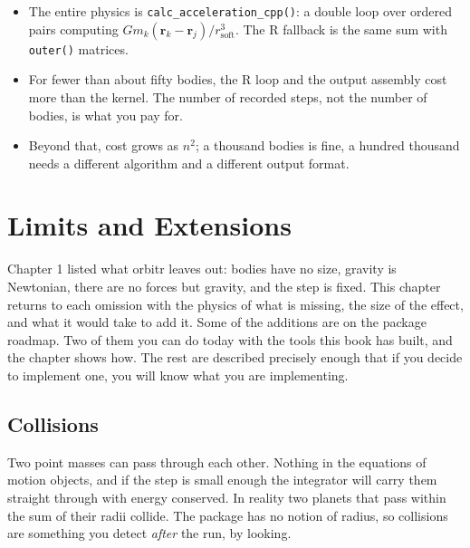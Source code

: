 \documentclass[
  10.5pt,
  letterpaper,
]{scrbook}
\providecommand{\tightlist}{%
  \setlength{\itemsep}{0pt}\setlength{\parskip}{0pt}}
\theoremstyle{plain}
\theoremstyle{remark}
\begin{document}
\begin{tcolorbox}[enhanced jigsaw, arc=.35mm, bottomrule=.15mm, bottomtitle=1mm, breakable, colback=white, colbacktitle=quarto-callout-tip-color!10!white, colframe=quarto-callout-tip-color-frame, coltitle=black, left=2mm, leftrule=.75mm, opacityback=0, opacitybacktitle=0.6, rightrule=.15mm, title={Key results}, titlerule=0mm, toprule=.15mm, toptitle=1mm]

\begin{itemize}
\tightlist
\item
  The entire physics is \texttt{calc\_acceleration\_cpp()}: a double
  loop over ordered pairs computing
  \(Gm_k(\mathbf{r}_k - \mathbf{r}_j)/r_{\mathrm{soft}}^3\). The R
  fallback is the same sum with \texttt{outer()} matrices.
\item
  For fewer than about fifty bodies, the R loop and the output assembly
  cost more than the kernel. The number of recorded steps, not the
  number of bodies, is what you pay for.
\item
  Beyond that, cost grows as \(n^2\); a thousand bodies is fine, a
  hundred thousand needs a different algorithm and a different output
  format.
\end{itemize}

\end{tcolorbox}

\chapter{Limits and Extensions}\label{sec-limits}

Chapter 1 listed what orbitr leaves out: bodies have no size, gravity is
Newtonian, there are no forces but gravity, and the step is fixed. This
chapter returns to each omission with the physics of what is missing,
the size of the effect, and what it would take to add it. Some of the
additions are on the package roadmap. Two of them you can do today with
the tools this book has built, and the chapter shows how. The rest are
described precisely enough that if you decide to implement one, you will
know what you are implementing.

\section{Collisions}\label{collisions}

Two point masses can pass through each other. Nothing in the equations
of motion objects, and if the step is small enough the integrator will
carry them straight through with energy conserved. In reality two
planets that pass within the sum of their radii collide. The package has
no notion of radius, so collisions are something you detect \emph{after}
the run, by looking.
\end{document}

